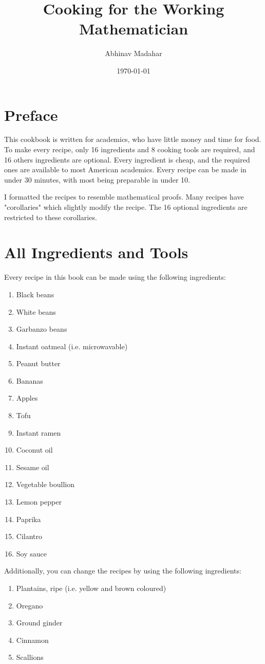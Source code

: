 \documentclass[twocolumn]{amsart}
\title{Cooking for the Working Mathematician}
\author{Abhinav Madahar}
\date{\today{}}
\begin{document}
\maketitle

\section{Preface}
This cookbook is written for academics, who have little money and time for
food. To make every recipe, only 16 ingredients and 8 cooking tools are
required, and 16 others ingredients are optional. Every ingredient is cheap,
and the required ones are available to most American academics. Every recipe
can be made in under 30 minutes, with most being preparable in under 10.

I formatted the recipes to resemble mathematical proofs. Many recipes have
"corollaries" which slightly modify the recipe. The 16 optional ingredients are
restricted to these corollaries.

\section{All Ingredients and Tools}
Every recipe in this book can be made using the following ingredients:
\begin{enumerate}
	\item Black beans
	\item White beans
	\item Garbanzo beans
	\item Instant oatmeal (i.e. microwavable)
	\item Peanut butter
	\item Bananas
	\item Apples
	\item Tofu
	\item Instant ramen
	\item Coconut oil
	\item Sesame oil
	\item Vegetable boullion
	\item Lemon pepper
	\item Paprika
	\item Cilantro
	\item Soy sauce
\end{enumerate}

Additionally, you can change the recipes by using the following ingredients:
\begin{enumerate}
	\item Plantains, ripe (i.e. yellow and brown coloured)
	\item Oregano
	\item Ground ginder
	\item Cinnamon
	\item Scallions
\end{enumerate}
\end{document}
